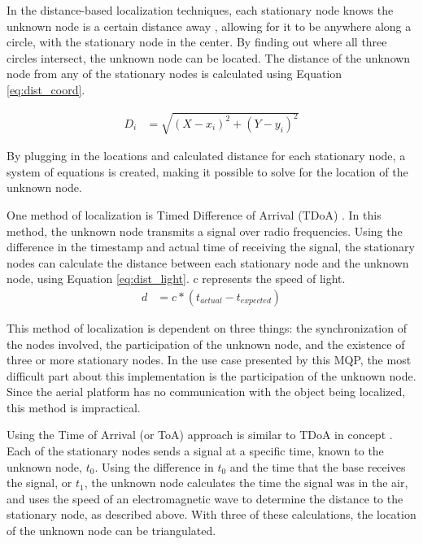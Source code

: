 In the distance-based localization techniques, each stationary node knows the unknown node is a certain distance away \cite{local_conf}, allowing for it to be anywhere along a circle, with the stationary node in the center. By finding out where all three circles intersect, the unknown node can be located. The distance of the unknown node from any of the stationary nodes is calculated using Equation \ref{eq:dist_coord}.\par 
\begin{align}\label{eq:dist_coord}
D_i &=\sqrt{(X - x_i)^2 + (Y-y_i)^2}
\end{align}\par
By plugging in the locations and calculated distance for each stationary node, a system of equations is created, making it possible to solve for the location of the unknown node.\par
One method of localization is Timed Difference of Arrival (TDoA) \cite{local_conf}. In this method, the unknown node transmits a signal over radio frequencies. Using the difference in the timestamp and actual time of receiving the signal, the stationary nodes can calculate the distance between each stationary node and the unknown node, using Equation \ref{eq:dist_light}. c represents the speed of light.
\begin{align}\label{eq:dist_light} 
    d &= c*(t_{actual} - t_{expected}) 
\end{align} \par
This method of localization is dependent on three things: the synchronization of the nodes involved, the participation of the unknown node, and the existence of three or more stationary nodes. In the use case presented by this MQP, the most difficult part about this implementation is the participation of the unknown node. Since the aerial platform has no communication with the object being localized, this method is impractical. \par

Using the Time of Arrival (or ToA) approach is similar to TDoA in concept \cite{local_conf}. Each of the stationary nodes sends a signal at a specific time, known to the unknown node, $t_0$. Using the difference in $t_0$ and the time that the base receives the signal, or $t_1$, the unknown node calculates the time the signal was in the air, and uses the speed of an electromagnetic wave to determine the distance to the stationary node, as described above. With three of these calculations, the location of the unknown node can be triangulated.\par

